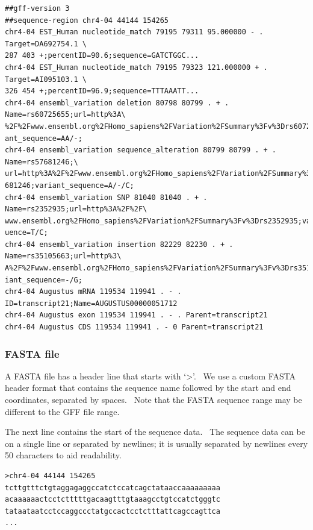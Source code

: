 \documentclass[letterpaper]{article}
\begin{document}
\begin{verbatim}
##gff-version 3
##sequence-region chr4-04 44144 154265
chr4-04 EST_Human nucleotide_match 79195 79311 95.000000 - . Target=DA692754.1 \
287 403 +;percentID=90.6;sequence=GATCTGGC...
chr4-04 EST_Human nucleotide_match 79195 79323 121.000000 + . Target=AI095103.1 \
326 454 +;percentID=96.9;sequence=TTTAAATT...
chr4-04 ensembl_variation deletion 80798 80799 . + . Name=rs60725655;url=http%3A\
%2F%2Fwww.ensembl.org%2FHomo_sapiens%2FVariation%2FSummary%3Fv%3Drs60725655;vari\
ant_sequence=AA/-;
chr4-04 ensembl_variation sequence_alteration 80799 80799 . + . Name=rs57681246;\
url=http%3A%2F%2Fwww.ensembl.org%2FHomo_sapiens%2FVariation%2FSummary%3Fv%3Drs57\
681246;variant_sequence=A/-/C;
chr4-04 ensembl_variation SNP 81040 81040 . + . Name=rs2352935;url=http%3A%2F%2F\
www.ensembl.org%2FHomo_sapiens%2FVariation%2FSummary%3Fv%3Drs2352935;variant_seq\
uence=T/C;
chr4-04 ensembl_variation insertion 82229 82230 . + . Name=rs35105663;url=http%3\
A%2F%2Fwww.ensembl.org%2FHomo_sapiens%2FVariation%2FSummary%3Fv%3Drs35105663;var\
iant_sequence=-/G;
chr4-04 Augustus mRNA 119534 119941 . - . ID=transcript21;Name=AUGUSTUS00000051712
chr4-04 Augustus exon 119534 119941 . - . Parent=transcript21
chr4-04 Augustus CDS 119534 119941 . - 0 Parent=transcript21
\end{verbatim}

\bigskip

{\color[rgb]{0.30980393,0.5058824,0.7411765}\subsubsection[FASTA file]{FASTA file}}
\hypertarget{RefHeading1541056909880}{}{
A FASTA file has a header line that starts with
{\textquoteleft}{\textgreater}{\textquoteright}. \ We use a custom
FASTA header format that contains the sequence name followed by the
start and end coordinates, separated by spaces. \ Note that the FASTA
sequence range may be different to the GFF file range.}

{The next line contains the start of the sequence data. \ The sequence
data can be on a single line or separated by newlines; it is usually
separated by newlines every 50 characters to aid readability.}

\begin{verbatim}
>chr4-04 44144 154265
tcttgtttctgtaggagaggccatctccatcagctataaccaaaaaaaaa
acaaaaaactcctctttttgacaagtttgtaaagcctgtccatctgggtc
tataataatcctccaggccctatgccactcctctttattcagccagttca
...
\end{verbatim}
\end{document}
